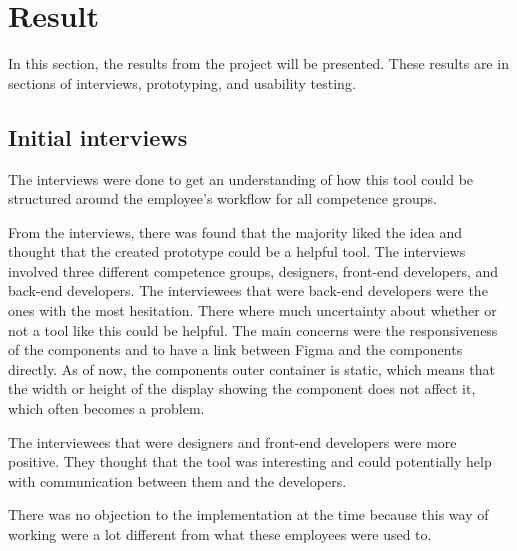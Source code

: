 \section{Result}


In this section, the results from the project will be presented. These results are in sections of interviews, prototyping, and usability testing.


\subsection{Initial interviews}%
\label{sub:Initial interviews}
The interviews were done to get an understanding of how this tool could be structured around the employee's workflow for all competence groups.

From the interviews, there was found that the majority liked the idea and thought that the created prototype could be a helpful tool.  The interviews involved three different competence groups, designers, front-end developers, and back-end developers. The interviewees that were back-end developers were the ones with the most hesitation. There where much uncertainty about whether or not a tool like this could be helpful. The main concerns were the responsiveness of the \glspl{component} and to have a link between Figma and the \glspl{component} directly. As of now, the \glspl{component} outer container is static, which means that the width or height of the display showing the \gls{component} does not affect it, which often becomes a problem.   

The interviewees that were designers and front-end developers were more positive. They thought that the tool was interesting and could potentially help with communication between them and the developers.

There was no objection to the implementation at the time because this way of working were a lot different from what these employees were used to.  

